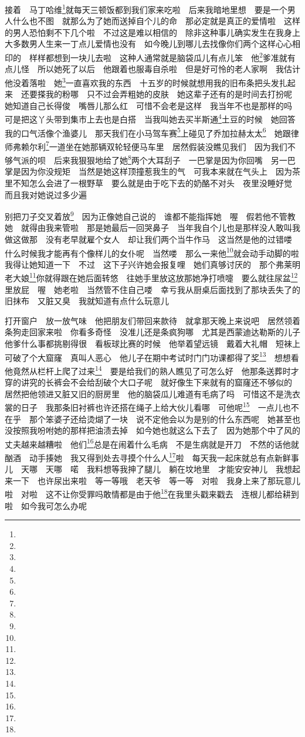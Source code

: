 \par 接着　马丁哈维\footnote{}就每天三顿饭都到我们家来吃啦　后来我暗地里想　要是一个男人什么也不图　就那么为了她而送掉自个儿的命　那必定就是真正的爱情啦　这样的男人恐怕剩不下几个啦　不过这是难以相信的　除非这种事儿确实发生在我身上　大多数男人生来一丁点儿爱情也没有　如今晚儿到哪儿去找像你们两个这样心心相印的　样样都想到一块儿去啦　这种人通常就是脑袋瓜儿有点儿笨　他\footnote{}爹准就有点儿怪　所以她死了以后　他跟着也服毒自杀啦　但是好可怜的老人家啊　我估计他没着落啦　她\footnote{}一直喜欢我的东西　十五岁的时候就想用我的旧布条把头发扎起来　还要搽我的粉哪　只不过会弄粗她的皮肤　她这辈子还有的是时间去打扮呢　她知道自己长得俊　嘴唇儿那么红　可惜不会老是这样　我当年不也是那样的吗　可是把这丫头带到集市上去也是白搭　当我叫她去买半斯通\footnote{}土豆的时候　她回答我的口气活像个渔婆儿　那天我们在小马驾车赛\footnote{}上碰见了乔加拉赫太太\footnote{}　她跟律师弗赖尔利\footnote{}一道坐在她那辆双轮轻便马车里　居然假装没瞧见我们　因为我们不够气派的呗　后来我狠狠地给了她\footnote{}两个大耳刮子　一巴掌是因为你回嘴　另一巴掌是因为你没规矩　当然是她这样顶撞惹我生的气　可我本来就在气头上　因为茶里不知怎么会进了一根野草　要么就是由于吃下去的奶酪不对头　夜里没睡好觉　而且我对她说过多少遍　
\par 别把刀子交叉着放\footnote{}　因为正像她自己说的　谁都不能指挥她　喔　假若他不管教她　就得由我来管啦　那是她最后一回哭鼻子　当年我自个儿也是那样没人敢叫我做这做那　没有老早就雇个女人　却让我们两个当牛作马　这当然是他的过错喽　什么时候我才能再有个像样儿的女仆呢　当然喽　那么一来他\footnote{}就会动手动脚的啦　我得让她知道一下　不过　这下子兴许她会报复哩　她们真够讨厌的　那个弗莱明老大娘\footnote{}你就得跟在她后面转悠　往她手里放这放那她净打喷嚏　要么就往尿盆\footnote{}里放屁　喔　她老啦　当然管不住自己喽　幸亏我从厨桌后面找到了那块丢失了的旧抹布　又脏又臭　我就知道有点什么玩意儿　
\par 打开窗户　放一放气味　他把朋友们带回来款待　就拿那天晚上来说吧　居然领着条狗走回家来啦　你看多奇怪　没准儿还是条疯狗哪　尤其是西蒙迪达勒斯的儿子　他爹什么事都挑剔得很　看板球比赛的时候　他举着望远镜　戴着大礼帽　短袜上可破了个大窟窿　真叫人恶心　他儿子在期中考试时门门功课都得了奖\footnote{}　想想看　他竟然从栏杆上爬了过来\footnote{}　要是给我们的熟人瞧见了可怎么好　他那条送葬时才穿的讲究的长裤会不会给刮破个大口子呢　就好像生下来就有的窟窿还不够似的　居然把他领进又脏又旧的厨房里　他的脑袋瓜儿难道有毛病了吗　可惜这不是洗衣裳的日子　我那条旧衬裤也许还搭在绳子上给大伙儿看哪　可他呢\footnote{}　一点儿也不在乎　那个笨婆子还给烫煳了一块　说不定他会以为是别的什么东西呢　她甚至也没按照我吩咐她的那样把油渍去掉　如今她也就这么下去了　因为她那个中了风的丈夫越来越糟啦　他们\footnote{}总是在闹着什么毛病　不是生病就是开刀　不然的话他就酗酒　动手揍她　我又得到处去寻摸个什么人\footnote{}啦　每天我一起床就总有点新鲜事儿　天哪　天哪　喏　我料想等我抻了腿儿　躺在坟地里　才能安安神儿　我想起来一下　也许尿出来啦　等一等哦　老天爷　等一等　对啦　我身上来了那玩意儿啦　对啦　这不让你受罪吗敢情都是由于他\footnote{}在我里头戳来戳去　连根儿都给耕到啦　如今我可怎么办呢　
